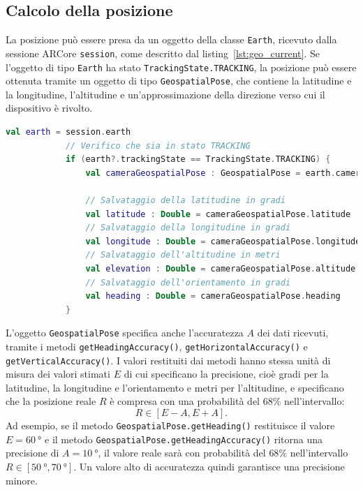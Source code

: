 \documentclass[crop=false, class=book]{standalone}
\begin{document}
	\subsection{Calcolo della posizione}
	La posizione può essere presa da un oggetto della classe \verb|Earth|, ricevuto dalla sessione ARCore \verb|session|, come descritto dal listing~\vref{lst:geo_current}. Se l'oggetto di tipo \verb|Earth| ha stato \verb|TrackingState.TRACKING|, la posizione può essere ottenuta tramite un oggetto di tipo \verb|GeospatialPose|, che contiene la latitudine e la longitudine, l'altitudine e un'approssimazione della direzione verso cui il dispositivo è rivolto.
	\begin{center}
		\begin{minipage}{0.95\textwidth}
			\begin{lstlisting}[caption={Calcolo della posizione corrente.}, label={lst:geo_current}, language=Kotlin]
			val earth = session.earth
			// Verifico che sia in stato TRACKING
			if (earth?.trackingState == TrackingState.TRACKING) {
				val cameraGeospatialPose : GeospatialPose = earth.cameraGeospatialPose
				
				// Salvataggio della latitudine in gradi
				val latitude : Double = cameraGeospatialPose.latitude
				// Salvataggio della longitudine in gradi
				val longitude : Double = cameraGeospatialPose.longitude
				// Salvataggio dell'altitudine in metri
				val elevation : Double = cameraGeospatialPose.altitude
				// Salvataggio dell'orientamento in gradi
				val heading : Double = cameraGeospatialPose.heading
			}
			\end{lstlisting}
		\end{minipage}
	\end{center}
	\noindent
	L'oggetto \verb|GeospatialPose| specifica anche l'accuratezza $A$ dei dati ricevuti, tramite i metodi \verb|getHeadingAccuracy()|, \verb|getHorizontalAccuracy()| e \verb|getVerticalAccuracy()|. I valori restituiti dai metodi hanno stessa unità di misura dei valori stimati $E$ di cui specificano la precisione, cioè gradi per la latitudine, la longitudine e l'orientamento e metri per l'altitudine, e specificano che la posizione reale $R$ è compresa con una probabilità del $68\%$ nell'intervallo:
	\[
		R \in [E-A, E+A].
	\] 
	Ad esempio, se il metodo \verb|GeospatialPose.getHeading()| restituisce il valore $E = \SI{60}{\degree}$ e il metodo \verb|GeospatialPose.getHeadingAccuracy()| ritorna una precisione di $A = \SI{10}{\degree}$, il valore reale sarà con probabilità del $68\%$ nell'intervallo $R \in [\SI{50}{\degree}, \SI{70}{\degree}]$. Un valore alto di accuratezza quindi garantisce una precisione minore.
\end{document}
